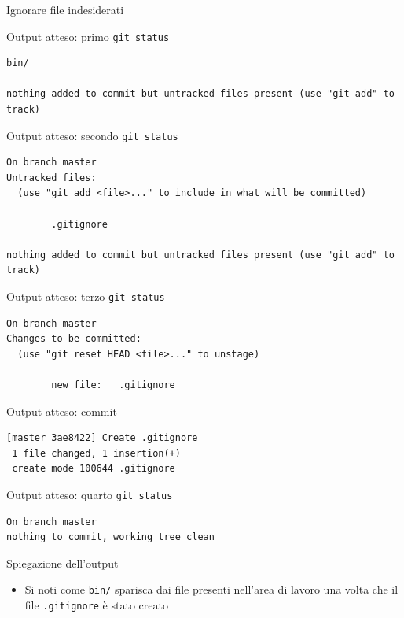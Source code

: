 \documentclass[presentation]{beamer}
\begin{document}
\begin{frame}{Ignorare file indesiderati}
\begin{block}{Output atteso: primo \texttt{git status}}
\begin{Verbatim}[fontsize=\scriptsize]
        bin/

nothing added to commit but untracked files present (use "git add" to track)
		\end{Verbatim}
	\end{block}
	\begin{block}{Output atteso: secondo \texttt{git status}}
		\begin{Verbatim}[fontsize=\scriptsize]
On branch master
Untracked files:
  (use "git add <file>..." to include in what will be committed)

        .gitignore

nothing added to commit but untracked files present (use "git add" to track)
		\end{Verbatim}
	\end{block}
	\begin{block}{Output atteso: terzo \texttt{git status}}
		\begin{Verbatim}[fontsize=\scriptsize]
On branch master
Changes to be committed:
  (use "git reset HEAD <file>..." to unstage)

        new file:   .gitignore

		\end{Verbatim}
	\end{block}
	\begin{block}{Output atteso: commit}
		\begin{Verbatim}[fontsize=\scriptsize]
[master 3ae8422] Create .gitignore
 1 file changed, 1 insertion(+)
 create mode 100644 .gitignore
		\end{Verbatim}
	\end{block}
	\begin{block}{Output atteso: quarto \texttt{git status}}
		\begin{Verbatim}[fontsize=\scriptsize]
On branch master
nothing to commit, working tree clean
		\end{Verbatim}
	\end{block}
	\begin{block}{Spiegazione dell'output}
		\begin{itemize}
			\item Si noti come \texttt{bin/} sparisca dai file presenti nell'area di lavoro una volta che il file \texttt{.gitignore} è stato creato
		\end{itemize}
	\end{block}
\end{frame}
\end{document}

